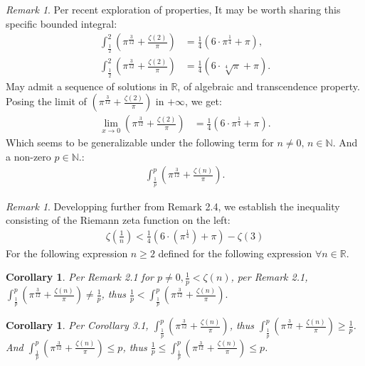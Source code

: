 \documentclass[10pt]{article}
\theoremstyle{plain}
\newtheorem{corollary}[theorem]{Corollary}
\theoremstyle{definition}
\theoremstyle{remark}
\newtheorem{remark}[theorem]{Remark}
\begin{document}
\begin{remark}
	Per recent exploration of properties, It may be worth sharing this specific bounded integral:
	\begin{align*}
		\int_{\frac{1}{2}}^{2} (\pi^{\frac{3}{12}} + \frac{\zeta(2)}{\pi}) &= \frac{1}{4} (6 \cdot \pi^{\frac{1}{4}} + \pi),\\
		\int_{\frac{1}{2}}^{2} (\pi^{\frac{3}{12}} + \frac{\zeta(2)}{\pi}) &= \frac{1}{4} (6 \cdot \sqrt[4]{\pi} + \pi).
	\end{align*}
	May admit a sequence of solutions in $\mathbb{R}$, of algebraic and transcendence property. Posing the limit of $(\pi^{\frac{3}{12}} + \frac{\zeta(2)}{\pi})$ in $+\infty$, we get:
	\begin{align*}
	\lim_{x \to 0} (\pi^{\frac{3}{12}} + \frac{\zeta(2)}{\pi}) &= \frac{1}{4} (6 \cdot \pi^{\frac{1}{4}} + \pi).
	\end{align*}
	Which seems to be generalizable under the following term for $n \neq 0, \, n \in \mathbb{N}.$ And a non-zero $p \in \mathbb{N}.$:
	\begin{align*}
		\int_{\frac{1}{p}}^{p} (\pi^{\frac{3}{12}} + \frac{\zeta(n)}{\pi}).
	\end{align*}
\end{remark}

\begin{remark}
	Developping further from Remark 2.4, we establish the inequality consisting of the Riemann zeta function on the left:
	\begin{align*}
		\zeta(\frac{1}{n}) < \frac{1}{4}(6 \cdot (\pi^{\frac{1}{4}}) + \pi) - \zeta(3)
	\end{align*}
	For the following expression $n \geq 2$ defined for the following expression $\forall n \in \mathbb{R}$.
\end{remark}

\begin{corollary}
	Per Remark 2.1 for $p \neq 0, \frac{1}{p} < \zeta(n)$, per Remark 2.1, $\int_{\frac{1}{p}}^{p} (\pi^{\frac{3}{12}} + \frac{\zeta(n)}{\pi}) \neq \frac{1}{p}$, thus $\frac{1}{p} < \int_{\frac{1}{p}}^{p} (\pi^{\frac{3}{12}} + \frac{\zeta(n)}{\pi}).$
\end{corollary}

\begin{corollary}
	Per Corollary 3.1, $\int_{\frac{1}{p}}^{p} (\pi^{\frac{3}{12}} + \frac{\zeta(n)}{\pi})$, thus $\int_{\frac{1}{p}}^{p} (\pi^{\frac{3}{12}} + \frac{\zeta(n)}{\pi}) \geq \frac{1}{p}$. And $\int_{\frac{1}{p}}^{p} (\pi^{\frac{3}{12}} + \frac{\zeta(n)}{\pi}) \leq p$, thus $\frac{1}{p} \leq \int_{\frac{1}{p}}^{p} (\pi^{\frac{3}{12}} + \frac{\zeta(n)}{\pi}) \leq p$.
\end{corollary}
\end{document}
